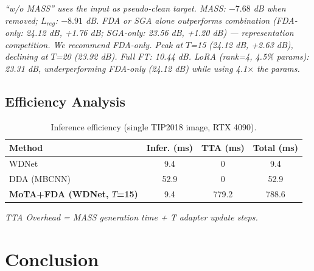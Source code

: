 \documentclass[10pt,twocolumn,letterpaper]{article}
\begin{document}
{\raggedright\footnotesize\textit{``w/o MASS'' uses the input as pseudo-clean target. MASS: $-7.68$ dB when removed; $L_{reg}$: $-8.91$ dB. FDA or SGA alone outperforms combination (FDA-only: 24.12 dB, +1.76 dB; SGA-only: 23.56 dB, +1.20 dB) — representation competition. We recommend FDA-only. Peak at $T$=15 (24.12 dB, +2.63 dB), declining at $T$=20 (23.92 dB). Full FT: 10.44 dB. LoRA (rank=4, 4.5\% params): 23.31 dB, underperforming FDA-only (24.12 dB) while using 4.1$\times$ the params.}}

\subsection{Efficiency Analysis}

\begin{table}[tbp]
\centering
\footnotesize
\caption{Inference efficiency (single TIP2018 image, RTX 4090).}
\label{tab:efficiency}
\setlength{\tabcolsep}{2pt}
\begin{tabular}{@{}lccc@{}}
\toprule
Method & Infer. (ms) & TTA (ms) & Total (ms) \\
\midrule
WDNet & 9.4 & 0 & 9.4 \\
DDA (MBCNN) & 52.9 & 0 & 52.9 \\
\textbf{MoTA+FDA (WDNet, $T$=15)} & 9.4 & 779.2 & 788.6 \\
\bottomrule
\end{tabular}
\end{table}

\textit{TTA Overhead = MASS generation time + T adapter update steps.}

\section{Conclusion}
\end{document}
